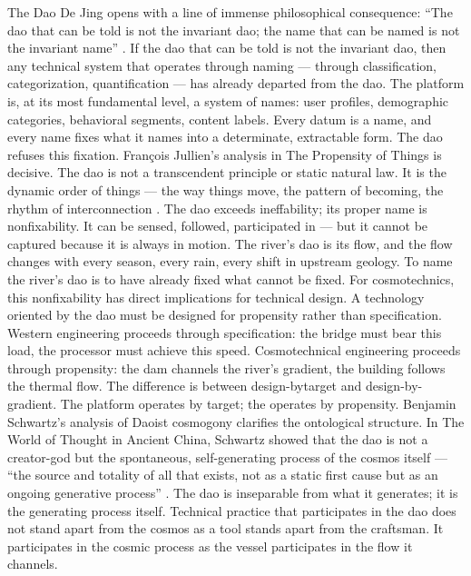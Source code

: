 The Dao De Jing opens with a line of immense philosophical consequence: “The dao that can be told is not the invariant dao; the name that can be named is not the invariant name” \cite[ch.~1]{laozi_2003}. If the dao that can be told is not the invariant dao, then any technical system that operates through naming — through classification, categorization, quantification — has already departed from the dao. The platform is, at its most fundamental level, a system of names: user profiles, demographic categories, behavioral segments, content labels. Every datum is a name, and every name fixes what it names into a determinate, extractable form. The dao refuses this fixation. François Jullien’s analysis in The Propensity of Things is decisive. The dao is not a transcendent principle or static natural law. It is the dynamic order of things — the way things move, the pattern of becoming, the rhythm of interconnection \cite{jullien_1995}. The dao exceeds ineffability; its proper name is nonfixability. It can be sensed, followed, participated in — but it cannot be captured because it is always in motion. The river’s dao is its flow, and the flow changes with every season, every rain, every shift in upstream geology. To name the river’s dao is to have already fixed what cannot be fixed. For cosmotechnics, this nonfixability has direct implications for technical design. A technology oriented by the dao must be designed for propensity rather than specification. Western engineering proceeds through specification: the bridge must bear this load, the processor must achieve this speed. Cosmotechnical engineering proceeds through propensity: the dam channels the river’s gradient, the building follows the thermal flow. The difference is between design-bytarget and design-by-gradient. The platform operates by target; the   operates by propensity. Benjamin Schwartz’s analysis of Daoist cosmogony clarifies the ontological structure. In The World of Thought in Ancient China, Schwartz showed that the dao is not a creator-god but the spontaneous, self-generating process of the cosmos itself — “the source and totality of all that exists, not as a static first cause but as an ongoing generative process” \cite[pp.~186-- 211]{schwartz_1985}. The dao is inseparable from what it generates; it is the generating process itself. Technical practice that participates in the dao does not stand apart from the cosmos as a tool stands apart from the craftsman. It participates in the cosmic process as the vessel participates in the flow it channels.

